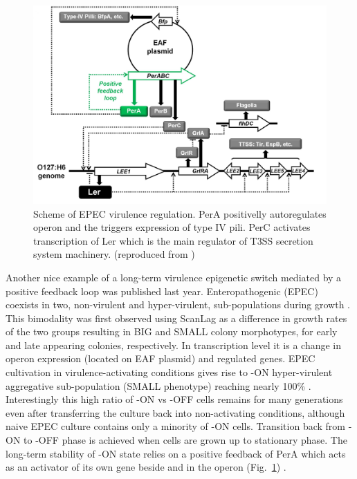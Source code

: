 \begin{figure}[h!]
  \centering
  \includegraphics[scale=0.2]{text/Pictures/perOperonRegulation.jpg}
	\caption{Scheme of EPEC virulence regulation. PerA positivelly autoregulates  operon and the triggers expression of type IV pili. PerC activates transcription of Ler which is the main regulator of T3SS secretion system machinery. (reproduced from \cite{ronin2017long})}
	\label{per}
\end{figure}

Another nice example of a long-term virulence epigenetic switch mediated by a positive feedback loop was published last year.
Enteropathogenic  (EPEC) coexists in two, non-virulent and hyper-virulent, sub-populations during growth \cite{ronin2017long}.
This bimodality was first observed  using ScanLag \cite{levin2014scanlag} as a difference in growth rates of the two groups resulting in BIG and SMALL colony morphotypes, for early and late appearing colonies, respectively.
In transcription level it is a change in  operon expression (located on EAF plasmid) and  regulated genes.
EPEC cultivation in virulence-activating conditions gives rise to -ON hyper-virulent aggregative sub-population (SMALL phenotype) reaching nearly 100\% \cite{ronin2017long}.
Interestingly this high ratio of -ON vs -OFF cells remains for many generations even after transferring the culture back into non-activating conditions, although naive EPEC culture contains only a minority of -ON cells.
Transition back from -ON to -OFF phase is achieved when cells are grown up to stationary phase.
The long-term stability of -ON state relies on a positive feedback of PerA which acts as an activator of its own gene beside  and  in the  operon (Fig.~\ref{per}) \cite{ibarra2003identification, ronin2017long}.

